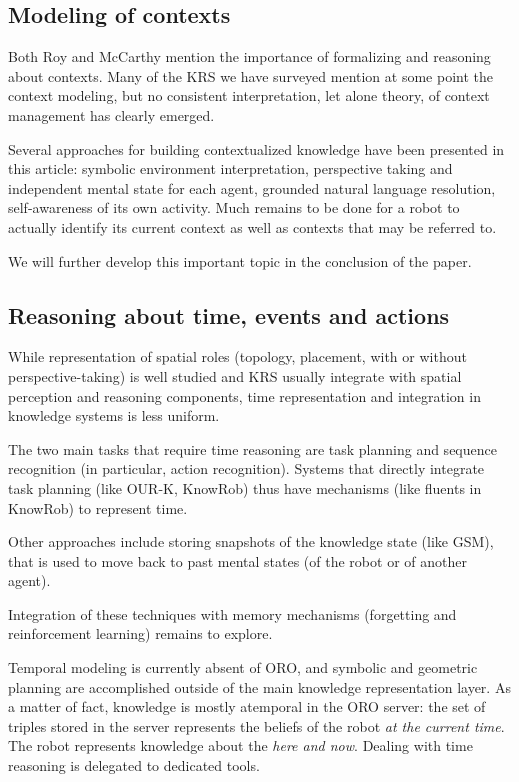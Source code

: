 \documentclass[a4paper, twocolumn]{article}
\begin{document}
\subsection{Modeling of contexts}

Both Roy and McCarthy mention the importance of formalizing and reasoning about
contexts. Many of the KRS we have surveyed mention at some point the context
modeling, but no consistent interpretation, let alone theory, of context
management has clearly emerged.

Several approaches for building contextualized knowledge have been presented in
this article: symbolic environment interpretation, perspective taking and
independent mental state for each agent, grounded natural language resolution,
self-awareness of its own activity. Much remains to be done for a robot to
actually identify its current context as well as contexts that may be referred
to.

We will further develop this important topic in the conclusion of the paper.

\subsection{Reasoning about time, events and actions}

While representation of spatial roles (topology, placement, with or without
perspective-taking) is well studied and KRS usually integrate with spatial
perception and reasoning components, time representation and integration in
knowledge systems is less uniform.

The two main tasks that require time reasoning are task planning and sequence
recognition (in particular, action recognition). Systems that directly
integrate task planning (like OUR-K, {\sc KnowRob}) thus have mechanisms (like
fluents in {\sc KnowRob}) to represent time.

Other approaches include storing snapshots of the knowledge state (like GSM),
that is used to move back to past mental states (of the robot or of another
agent).

Integration of these techniques with memory mechanisms (forgetting and
reinforcement learning) remains to explore.

Temporal modeling is currently absent of ORO, and symbolic and geometric
planning are accomplished outside of the main knowledge representation
layer. As a matter of fact, knowledge is mostly atemporal in the ORO server: the
set of triples stored in the server represents the beliefs of the robot
\emph{at the current time}. The robot represents knowledge about the \emph{here
and now}. Dealing with time reasoning is delegated to dedicated tools.
\end{document}
